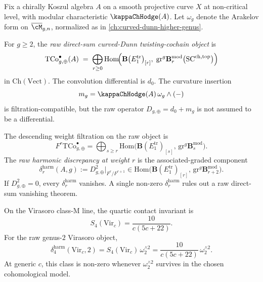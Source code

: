 Fix a chirally Koszul algebra \(A\) on a smooth projective curve
\(X\) at non-critical level, with modular characteristic
\(\kappaChHodge(A)\). Let \(\omega_{g}\) denote the Arakelov form on
\(\overline{\cM}_{g,n}\), normalized as in
\autoref{ch:curved-dunn-higher-genus}.

\begin{definition}
\label{def:curved-dunn-complex-raw}
For \(g \ge 2\), the \emph{raw direct-sum curved-Dunn
twisting-cochain object} is
\[
 \mathrm{TCo}^{\bullet}_{g,\oplus}(A)
 \;=\;
 \bigoplus_{r \ge 0}
 \mathrm{Hom}\!\Bigl(
 \mathbf{B}\bigl(E_{1}^{\mathrm{tr}}\bigr)_{[r]},\;
 \mathrm{gr}^{g}\mathbf{B}^{\mathrm{mod}}_{r}\bigl(
 \mathrm{SC}^{\mathrm{ch,top}}\bigr)\Bigr)
\]
in \(\mathrm{Ch}(\mathrm{Vect})\). The convolution differential is
\(d_{0}\). The curvature insertion
\[
 m_{g}=\kappaChHodge(A)\,\omega_{g}\wedge(-)
\]
is filtration-compatible, but the raw operator
\(D_{g,\oplus}=d_{0}+m_{g}\) is not assumed to be a differential.
\end{definition}

\begin{definition}
\label{def:harmonic-discrepancy}
The descending weight filtration on the raw object is
\[
F^{r}\mathrm{TCo}^{\bullet}_{g,\oplus}
 =
 \bigoplus_{s \ge r}
 \mathrm{Hom}\!\bigl(
 \mathbf{B}(E_{1}^{\mathrm{tr}})_{[s]},\,
 \mathrm{gr}^{g}\mathbf{B}^{\mathrm{mod}}_{s}\bigr).
\]
The \emph{raw harmonic discrepancy at weight \(r\)} is the
associated-graded component
\[
 \delta_{r}^{\mathrm{harm}}(A,g)
 :=
 D_{g,\oplus}^{2}\Big|_{F^{r}/F^{r+1}}
 \in
 \mathrm{Hom}\!\bigl(
 \mathbf{B}(E_{1}^{\mathrm{tr}})_{[r]},\,
 \mathrm{gr}^{g}\mathbf{B}^{\mathrm{mod}}_{r+2}\bigr).
\]
If \(D_{g,\oplus}^{2}=0\), every
\(\delta_{r}^{\mathrm{harm}}\) vanishes. A single non-zero
\(\delta_{r}^{\mathrm{harm}}\) rules out a raw direct-sum
vanishing theorem.
\end{definition}

\begin{lemma}
\label{lem:low-weight-discrepancy-class-M}
On the Virasoro class-\(\mathrm{M}\) line, the quartic contact
invariant is
\[
 S_{4}(\mathrm{Vir}_{c})=\frac{10}{c(5c+22)}.
\]
For the raw genus-\(2\) Virasoro object,
\[
 \delta_{4}^{\mathrm{harm}}(\mathrm{Vir}_{c},2)
 =
 S_{4}(\mathrm{Vir}_{c})\,\omega_{2}^{\wedge 2}
 =
 \frac{10}{c(5c+22)}\,\omega_{2}^{\wedge 2}.
\]
At generic \(c\), this class is non-zero whenever
\(\omega_{2}^{\wedge2}\) survives in the chosen cohomological
model.
\end{lemma}

